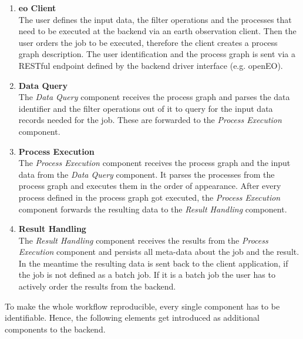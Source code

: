 \documentclass[draft,final]{vutinfth} %
\begin{document}
 \begin{enumerate}
	\item \textbf{\gls{eo} Client} \\
	The user defines the input data, the filter operations and the processes that need to be executed at the backend via an earth observation client. Then the user orders the job to be executed, therefore the client creates a process graph description. The user identification and the process graph is sent via a RESTful endpoint defined by the backend driver interface (e.g. openEO).  
	\item \textbf{Data Query} \\ 
	The \textit{Data Query} component receives the process graph and parses the data identifier and the filter operations out of it to query for the input data records needed for the job. These are forwarded to the \textit{Process Execution} component.  
	\item \textbf{Process Execution} \\
	The \textit{Process Execution} component receives the process graph and the input data from the \textit{Data Query} component. It parses the processes from the process graph and executes them in the order of appearance. After every process defined in the process graph got executed, the \textit{Process Execution} component forwards the resulting data to the \textit{Result Handling} component.   
	\item \textbf{Result Handling} \\ 
	The \textit{Result Handling} component receives the results from the \textit{Process Execution} component and persists all meta-data about the job and the result. In the meantime the resulting data is sent back to the client application, if the job is not defined as a batch job. If it is a batch job the user has to actively order the results from the backend.  
\end{enumerate}

To make the whole workflow reproducible, every single component has to be identifiable. Hence, the following elements get introduced as additional components to the backend.
\end{document}
